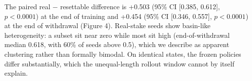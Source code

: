 \documentclass[Afour,sageh,times,doublespace]{sagej}
\begin{document}
The paired real − resettable difference is +0.503 (95\% CI {[}0.385, 0.612{]}, \(p < 0.0001\)) at the end of training and +0.454 (95\% CI {[}0.346, 0.557{]}, \(p < 0.0001\)) at the end of withdrawal (Figure 4). Real-stake seeds show basin-like heterogeneity: a subset sit near zero while most sit high (end-of-withdrawal median 0.618, with 60\% of seeds above 0.5), which we describe as apparent clustering rather than formally bimodal. On identical states, the frozen policies differ substantially, which the unequal-length rollout window cannot by itself explain.
\end{document}
